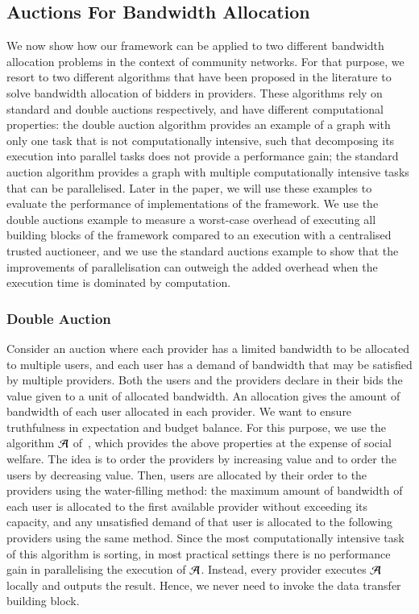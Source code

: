 \subsection{Auctions For Bandwidth Allocation}

We now show how our framework can be applied to two different bandwidth allocation problems in the context of community networks. For that purpose, we resort to two different 
algorithms that have been proposed in the literature to solve bandwidth allocation of bidders in providers. These 
algorithms rely on standard and double auctions respectively, and have different computational properties: the double auction algorithm 
provides an example of a graph with only one task that is not computationally intensive, such that decomposing its execution into 
parallel tasks does not provide a performance gain;  the standard auction algorithm provides a graph with multiple computationally 
intensive tasks that can be parallelised. Later in the paper, we will use these examples to evaluate the performance of implementations
of the framework. We use the double auctions example to measure a worst-case overhead of executing all building blocks of the framework 
compared to an execution with a centralised trusted auctioneer, and we use the standard auctions example to show that the improvements of
parallelisation can outweigh the added overhead when the execution time is dominated by computation.

\subsubsection{Double Auction}
\label{sec:instances-double-auction}
Consider an auction where each provider has a limited bandwidth to be allocated to multiple users,
and each user has a demand of bandwidth that may be satisfied by multiple providers.
Both the users and the providers declare in their bids the value given to a unit
of allocated bandwidth. An allocation gives the amount of bandwidth of each user
allocated in each provider. We want to ensure truthfulness in expectation and budget balance.
For this purpose, we use the algorithm $\mathcal{A}$ of~\cite{Zheng2014Star},
which provides the above properties at the expense
of social welfare. The idea is to order the providers by increasing
value and to order the users by decreasing value.
Then, users are allocated by their order to the providers using the water-filling method:
the maximum amount of bandwidth of each user is allocated
to the first available provider without exceeding its capacity,
and any unsatisfied demand of that user is allocated to the following providers using the same method.
Since the most computationally intensive task of this algorithm
is sorting, in most practical settings there is no performance gain in parallelising the execution of $\mathcal{A}$.
Instead, every provider executes $\mathcal{A}$ locally and outputs the result.
Hence, we never need to invoke the data transfer building block.


